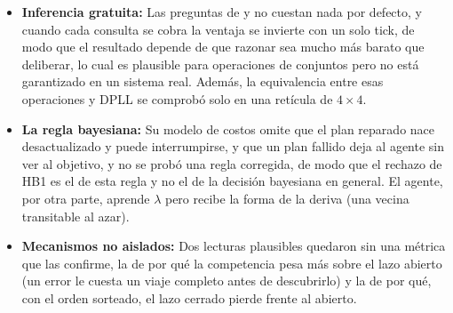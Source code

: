\begin{itemize}[leftmargin=1.4em, itemsep=0.3em]
  \item \textbf{Inferencia gratuita:} Las preguntas de \KB{} y \BY{} no cuestan nada por defecto, y cuando cada consulta se cobra la ventaja se invierte con un solo tick, de modo que el resultado depende de que razonar sea mucho más barato que deliberar, lo cual es plausible para operaciones de conjuntos pero no está garantizado en un sistema real. Además, la equivalencia entre esas operaciones y DPLL se comprobó solo en una retícula de $4\times4$.
  \item \textbf{La regla bayesiana:} Su modelo de costos omite que el plan reparado nace desactualizado y puede interrumpirse, y que un plan fallido deja al agente sin ver al objetivo, y no se probó una regla corregida, de modo que el rechazo de HB1 es el de esta regla y no el de la decisión bayesiana en general. El agente, por otra parte, aprende $\lambda$ pero recibe la forma de la deriva (una vecina transitable al azar).
  \item \textbf{Mecanismos no aislados:} Dos lecturas plausibles quedaron sin una métrica que las confirme, la de por qué la competencia pesa más sobre el lazo abierto (un error le cuesta un viaje completo antes de descubrirlo) y la de por qué, con el orden sorteado, el lazo cerrado pierde frente al abierto.
\end{itemize}
